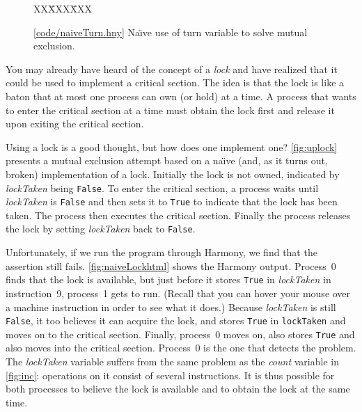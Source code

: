 \documentclass{report}
\newcommand{\harmonysource}[1]{
\begin{tabbing}
XX\=XXX\=XXX\kill
    
\end{tabbing}
}
\newcommand{\harmonylink}[1]{%
[\href{https://www.cs.cornell.edu/home/rvr/harmony/#1}{\underline{#1}}]%
}
\newenvironment{code}{
\tcolorbox
}{
\endtcolorbox
}
\begin{document}
\begin{figure}
\begin{code}
\harmonysource{naiveTurn}
\end{code}
\caption{\harmonylink{code/naiveTurn.hny} Na\"{\i}ve use of turn variable to solve mutual exclusion.}
\label{fig:upturn}
\end{figure}

%

You may already have heard of the concept of a \emph{lock}
%
and have realized that
it could be used to implement a critical section.
The idea is that the lock is like a baton that at most one process can own
(or hold) at a time.
A process that wants to enter the critical section at a time must obtain the
lock first and release it upon exiting the critical section.

Using a lock is a good thought, but how does one implement one?
\autoref{fig:uplock} presents a mutual exclusion attempt based on a
na\"{\i}ve (and, as it turns out, broken) implementation of a lock.
Initially the lock is not owned, indicated by \textit{lockTaken} being \texttt{False}.
To enter the critical section, a process waits until \textit{lockTaken} is \texttt{False}
and then sets it to \texttt{True} to indicate that the lock has been taken.
The process then executes the critical section.  Finally the process
releases the lock by setting \textit{lockTaken} back to \texttt{False}.

Unfortunately, if we run the program through Harmony,
we find that the assertion still fails.
\autoref{fig:naiveLockhtml} shows the Harmony output.
Process~0 finds that the lock is available, but just before it stores
\texttt{True} in \textit{lockTaken} in instruction~9, process~1 gets
to run.
(Recall that you can hover your mouse over a machine instruction in order
to see what it does.)
Because \textit{lockTaken} is still \texttt{False}, it too
believes it can acquire the lock, and stores \texttt{True} in
\texttt{lockTaken} and moves on to the critical section.
Finally, process~0 moves on, also stores \texttt{True} and also moves
into the critical section.  Process~0 is the one that detects the
problem.
The \textit{lockTaken} variable
suffers from the same problem as the \textit{count} variable
in \autoref{fig:inc}: operations
on it consist of several instructions.  It is thus possible
for both processes to believe the lock is available and to obtain the lock
at the same time.
\end{document}
